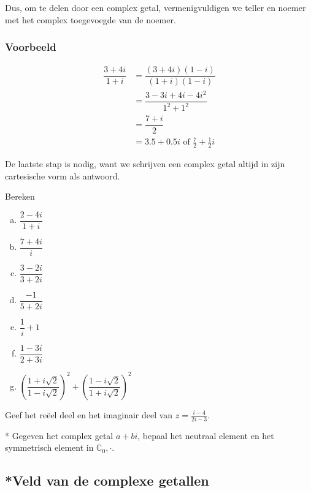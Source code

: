 \documentclass[12pt,twoside,a4paper]{article}
\begin{document}
Dus, om te delen door een complex getal, vermenigvuldigen we teller en noemer met het complex toegevoegde van de noemer.

\subsubsection*{Voorbeeld}
\begin{align*}
  \dfrac{3+4i}{1+i} &= \dfrac{(3+4i)(1-i)}{(1+i)(1-i)} \\
                    &= \dfrac{3-3i + 4i - 4i^2}{1^2 + 1^2}\\
                    &= \dfrac{7 + i}{2}\\
                    &= 3.5 + 0.5i \mbox{ of } \frac{7}{2} + \frac{1}{2}i
\end{align*}

De laatste stap is nodig, want we schrijven een complex getal altijd in zijn cartesische vorm als antwoord.

\begin{oefening}
  Bereken
  \begin{multicols}{2}
  \begin{enumerate}[(a)]
  \itemsep1em
  \item $\displaystyle \dfrac{2-4i}{1+i}$
  \item $\displaystyle \dfrac{7+4i}{i}$
  \item $\displaystyle \dfrac{3-2i}{3+2i}$
  \item $\displaystyle \dfrac{-1}{5+2i}$
  \item $\displaystyle \dfrac{1}{i}+1$
  \item $\displaystyle \dfrac{1-3i}{2+3i}$
  \item $\displaystyle \left(\dfrac{1+i\sqrt{2}}{1-i\sqrt{2}}\right)^2+\left(\dfrac{1-i\sqrt{2}}{1+i\sqrt{2}}\right)^2$
  \end{enumerate}
  \end{multicols}
\end{oefening}

\begin{oefening}
  Geef het reëel deel en het imaginair deel van $z=\frac{i-4}{2i-3}$.
\end{oefening}

\begin{oefening}*
  Gegeven het complex getal $a+bi$, bepaal het neutraal element en het symmetrisch element in $\mathbb{C}_0, \cdot$.
\end{oefening}

\subsection{*Veld van de complexe getallen}
\end{document}
